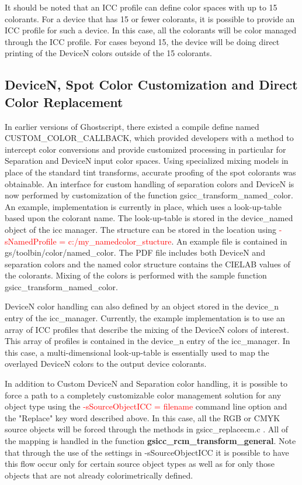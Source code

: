 \documentclass[12pt,notitlepage]{article}
\begin{document}
It should be noted that an ICC profile can define color spaces with up to 15 colorants.  For a device that has 15 or fewer colorants, it is possible to provide an ICC profile for such a device.  In this case, all the colorants will be color managed through the ICC profile.  For cases beyond 15, the device will be doing direct printing of the DeviceN colors outside of the 15 colorants.

\subsection{DeviceN, Spot Color Customization and Direct Color Replacement}
\label{sec:devn}

In earlier versions of Ghostscript, there existed a compile define named \\
CUSTOM\_COLOR\_CALLBACK, which provided developers with a method to intercept color conversions and provide customized processing in particular for Separation and DeviceN input color spaces.  Using specialized mixing models in place of the standard tint transforms, accurate proofing of the spot colorants was obtainable.  An interface for custom handling of separation colors and DeviceN is now performed by customization of the function gsicc\_transform\_named\_color.  An example, implementation is currently in place, which uses a look-up-table based upon the colorant name.  The look-up-table is stored in the device\_named object of the icc manager.  The structure can be stored in the location using \textcolor{red}{-sNamedProfile = c:/my\_namedcolor\_stucture}.   An example file is contained in gs/toolbin/color/named\_color.  The PDF file includes both DeviceN and separation colors and the named color structure contains the CIELAB values of the colorants.   Mixing of the colors is performed with the sample function gsicc\_transform\_named\_color.

DeviceN color handling can also defined by an object stored in the device\_n entry of the icc\_manager.  Currently, the example implementation is to use an array of ICC profiles that describe the mixing of the DeviceN colors of interest.  This array of profiles is contained in the device\_n entry of the icc\_manager.  In this case, a multi-dimensional look-up-table is essentially used to map the overlayed DeviceN colors to the output device colorants.

In addition to Custom DeviceN and Separation color handling, it is possible to force a path to a completely customizable color management solution for any object type using the \textcolor{red}{-sSourceObjectICC = filename} command line option and the "Replace" key word described above.  In this case, all the RGB or CMYK source objects will be forced through the methods in gsicc\_replacecm.c .  All of the mapping is handled in the function {\bf gsicc\_rcm\_transform\_general}.  Note that through the use of the settings in -sSourceObjectICC it is possible to have this flow occur only for certain source object types as well as for only those objects that are not already colorimetrically defined.
\end{document}
